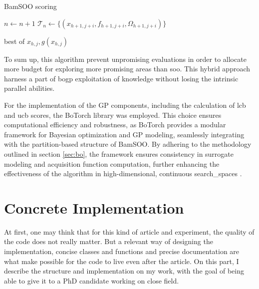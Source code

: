 \begin{algorithm}[h]
    \caption{BamSOO scoring}
    \label{algo:bamsoo_scoring}    
    
                    $n \gets n+1$ \;
                    $\mathcal{T}_n \gets \{(x_{h+1,j+i}, f_{h+1,j+i}, \Omega_{h+1,j+i})\}$ \;
                
    \Return best of $x_{h,j}, g(x_{h,j})$ \;
    \end{algorithm}

To sum up, this algorithm prevent unpromising evaluations in order to allocate more budget for exploring more promising areas than \acrshort{soo}. This hybrid approach harness a part of \acrshort{bogp} exploitation of knowledge without losing the intrinsic parallel abilities.

For the implementation of the GP components, including the calculation of \acrshort{lcb} and \acrshort{ucb} scores, the BoTorch library was employed. This choice ensures computational efficiency and robustness, as BoTorch provides a modular framework for Bayesian optimization and GP modeling, seamlessly integrating with the partition-based structure of BamSOO. By adhering to the methodology outlined in section \ref{sec:bo}, the framework ensures consistency in surrogate modeling and acquisition function computation, further enhancing the effectiveness of the algorithm in high-dimensional, continuous \glspl{search_space} .

\section{Concrete Implementation}
\label{sec:concrete_impl}

At first, one may think that for this kind of article and experiment, the quality of the code does not really matter. But a relevant way of designing the implementation, concise classes and functions and precise documentation are what make possible for the code to live even after the article. On this part, I describe the structure and implementation on my work, with the goal of being able to give it to a PhD candidate working on close field.

